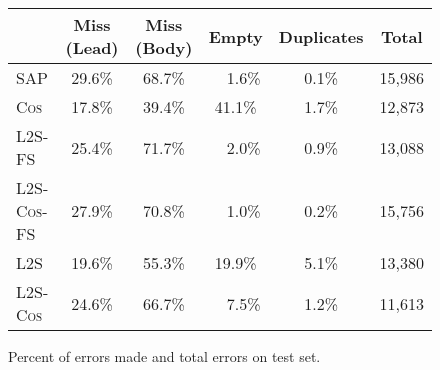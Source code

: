 \begin{figure}[t]
  \center
  \begin{tabular}{l ccccc }
\toprule
    & Miss (Lead) &     Miss (Body) &         Empty &   Duplicates & Total \\
    \midrule
    \small \textsc{SAP}         
      & 29.6\% & 68.7\% & ~~1.6\% & 0.1\% & 15,986\\
    \small \textsc{Cos}     
      & 17.8\% & 39.4\% & 41.1\% & 1.7\% & 12,873\\
    \small \textsc{L2S-FS}      
      & 25.4\% & 71.7\% & ~~2.0\% & 0.9\% & 13,088\\
    \small \textsc{L2S-Cos-FS}
      & 27.9\% & 70.8\% & ~~1.0\% & 0.2\% & 15,756\\
    \small \textsc{L2S}           
      & 19.6\% & 55.3\% & 19.9\% & 5.1\% & 13,380\\
    \small \textsc{L2S-Cos}    
      & 24.6\% & 66.7\% & ~~7.5\% & 1.2\% & 11,613\\
\bottomrule
  \end{tabular}
  \caption{Percent of errors made and total errors on test set.}
  \label{tab:errors}
\end{figure}

